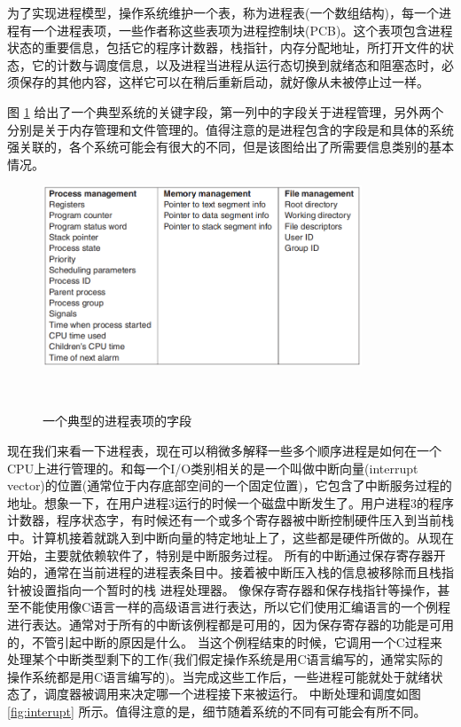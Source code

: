 	为了实现进程模型，操作系统维护一个表，称为进程表(一个数组结构)，每一个进程有一个进程表项，一些作者称这些表项为进程控制块(PCB)。这个表项包含进程状态的重要信息，包括它的程序计数器，栈指针，内存分配地址，所打开文件的状态，它的计数与调度信息，以及进程当进程从运行态切换到就绪态和阻塞态时，必须保存的其他内容，这样它可以在稍后重新启动，就好像从未被停止过一样。
	
	图 \ref{fig:processentry} 给出了一个典型系统的关键字段，第一列中的字段关于进程管理，另外两个分别是关于内存管理和文件管理的。值得注意的是进程包含的字段是和具体的系统强关联的，各个系统可能会有很大的不同，但是该图给出了所需要信息类别的基本情况。

	\begin{figure}[ht]\small
		\centering
		\includegraphics[width=0.85\textwidth]{FIG/2-4.png}
		\caption{一个典型的进程表项的字段}　\label{fig:processentry}
	\end{figure}

	现在我们来看一下进程表，现在可以稍微多解释一些多个顺序进程是如何在一个CPU上进行管理的。和每一个I/O类别相关的是一个叫做中断向量(interrupt vector)的位置(通常位于内存底部空间的一个固定位置)，它包含了中断服务过程的地址。想象一下，在用户进程3运行的时候一个磁盘中断发生了。用户进程3的程序计数器，程序状态字，有时候还有一个或多个寄存器被中断控制硬件压入到当前栈中。计算机接着就跳入到中断向量的特定地址上了，这些都是硬件所做的。从现在开始，主要就依赖软件了，特别是中断服务过程。
	所有的中断通过保存寄存器开始的，通常在当前进程的进程表条目中。接着被中断压入栈的信息被移除而且栈指针被设置指向一个暂时的栈
	进程处理器。
	像保存寄存器和保存栈指针等操作，甚至不能使用像C语言一样的高级语言进行表达，所以它们使用汇编语言的一个例程进行表达。通常对于所有的中断该例程都是可用的，因为保存寄存器的功能是可用的，不管引起中断的原因是什么。
	当这个例程结束的时候，它调用一个C过程来处理某个中断类型剩下的工作(我们假定操作系统是用C语言编写的，通常实际的操作系统都是用C语言编写的)。当完成这些工作后，一些进程可能就处于就绪状态了，调度器被调用来决定哪一个进程接下来被运行。
	中断处理和调度如图 \ref{fig:interupt} 所示。值得注意的是，细节随着系统的不同有可能会有所不同。

